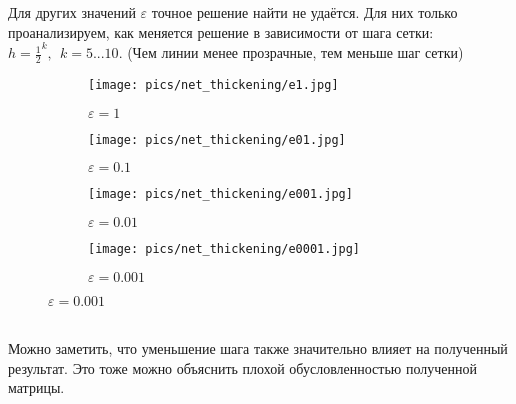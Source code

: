 \documentclass[a4paper,12pt]{extarticle}
\begin{document}
    Для других значений $\varepsilon$ точное решение найти не удаётся.
    Для них только проанализируем, как меняется решение в зависимости от шага сетки: $h = \frac{1}{2}^k, ~~ k = 5...10$. (Чем линии менее прозрачные, тем меньше шаг сетки)
     
    \begin{figure}[H]
    \begin{subfigure}{0.5\textwidth}
    \texttt{[image: pics/net\_thickening/e1.jpg]} 
    \caption{$\varepsilon=1$}
    \label{fig}
    \end{subfigure}
    \begin{subfigure}{0.5\textwidth}
    \texttt{[image: pics/net\_thickening/e01.jpg]} 
    \caption{$\varepsilon=0.1$}
    \label{fig}
    \end{subfigure}
    \begin{subfigure}{0.5\textwidth}
    \texttt{[image: pics/net\_thickening/e001.jpg]} 
    \caption{$\varepsilon=0.01$}
    \label{fig}
    \end{subfigure}
    \begin{subfigure}{0.5\textwidth}
    \texttt{[image: pics/net\_thickening/e0001.jpg]} 
    \caption{$\varepsilon=0.001$}
    \label{fig}
    \end{subfigure}
    \end{figure}\\
    
    Можно заметить, что уменьшение шага также значительно влияет на полученный результат. Это тоже можно объяснить плохой обусловленностью полученной матрицы.
    
    
\end{document}
